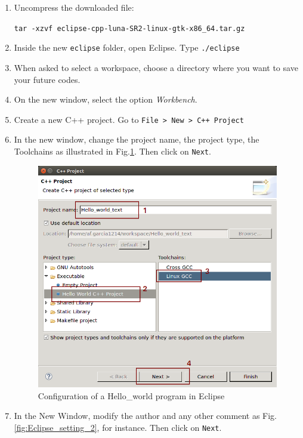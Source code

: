 \documentclass[12pt, oneside]{book}              %
\begin{document}
\begin{enumerate}
\item Uncompress the downloaded file:

\texttt{tar -xzvf eclipse-cpp-luna-SR2-linux-gtk-x86\_64.tar.gz}

\item Inside the new \texttt{eclipse} folder, open Eclipse. Type \texttt{./eclipse}

\item When asked to select a workspace, choose a directory where you want to save your
future codes.

\item On the new window, select the option \textit{Workbench}.

\item Create a new C++ project. Go to \texttt{File > New > C++ Project}

\item In the new window, change the project name, the project type, the Toolchains as
illustrated in Fig.\ref{fig:Eclipse_setting_project}. Then click on \texttt{Next}.

\begin{figure}[t!]
\centering
\includegraphics[width=0.54\linewidth]{./Imags_Doc/Eclipse_setting_project}
\caption[Configuration of a Hello\_world program in Eclipse]{Configuration of a Hello\_world program in Eclipse}
\label{fig:Eclipse_setting_project}
\end{figure}

\item In the New Window, modify the author and any other comment as Fig. \ref{fig:Eclipse_setting_2},
for instance. Then click on \texttt{Next}.


\end{enumerate}
\end{document}
